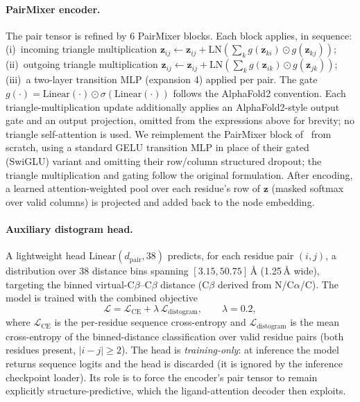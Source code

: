 \documentclass[11pt,letterpaper]{article}
\newcommand{\bz}{\mathbf{z}}
\begin{document}
\paragraph{PairMixer encoder.}
The pair tensor is refined by 6 PairMixer blocks. Each block applies, in sequence:
(i)~incoming triangle multiplication
$\bz_{ij} \leftarrow \bz_{ij} + \text{LN}(\sum_k g(\bz_{ki}) \odot g(\bz_{kj}))$;
(ii)~outgoing triangle multiplication
$\bz_{ij} \leftarrow \bz_{ij} + \text{LN}(\sum_k g(\bz_{ik}) \odot g(\bz_{jk}))$;
(iii)~a two-layer transition MLP (expansion 4) applied per pair. The gate
$g(\cdot) = \text{Linear}(\cdot) \odot \sigma(\text{Linear}(\cdot))$ follows the AlphaFold2
convention. Each triangle-multiplication update additionally applies an AlphaFold2-style output gate
and an output projection, omitted from the expressions above for brevity; no triangle self-attention
is used. We reimplement the PairMixer block
of~\citet{ouyangzhang2025pairmixer} from scratch, using a standard GELU transition MLP in place of
their gated (SwiGLU) variant and omitting their row/column structured dropout; the triangle
multiplication and gating follow the original formulation. After encoding, a learned
attention-weighted pool over each residue's row of $\bz$ (masked softmax over valid columns) is
projected and added back to the node embedding.

\paragraph{Auxiliary distogram head.}
\label{sec:distogram}
A lightweight head $\text{Linear}(d_{\text{pair}}, 38)$ predicts, for each residue pair $(i,j)$, a
distribution over 38 distance bins spanning $[3.15, 50.75]$\,{\AA} (1.25\,{\AA} wide), targeting the
binned virtual-C$\beta$--C$\beta$ distance (C$\beta$ derived from N/C$\alpha$/C). The model is trained
with the combined objective
\begin{equation}
  \mathcal{L} = \mathcal{L}_{\text{CE}} + \lambda\,\mathcal{L}_{\text{distogram}},
  \qquad \lambda = 0.2,
\end{equation}
where $\mathcal{L}_{\text{CE}}$ is the per-residue sequence cross-entropy and
$\mathcal{L}_{\text{distogram}}$ is the mean cross-entropy of the binned-distance classification over
valid residue pairs (both residues present, $|i-j|\geq 2$). The head is \emph{training-only}: at inference the model returns sequence logits
and the head is discarded (it is ignored by the inference checkpoint loader). Its role is to force the
encoder's pair tensor to remain explicitly structure-predictive, which the ligand-attention decoder
then exploits.
\end{document}
